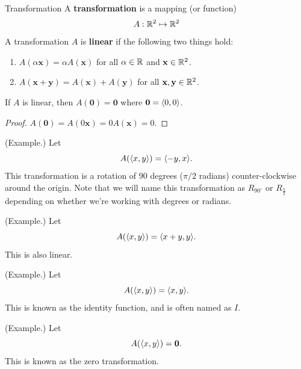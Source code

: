 \documentclass[letterpaper]{article}
\begin{document}
\begin{definition}{Transformation}{}
    A \textbf{transformation} is a mapping (or function) 
    \[A: \mathbb{R}^2 \mapsto \mathbb{R}^2\]
    A transformation $A$ is \textbf{linear} if the following two things hold: 
    \begin{enumerate}
        \item $A(\alpha \mathbf{x}) = \alpha A(\mathbf{x})$ for all $\alpha \in \mathbb{R}$ and $\mathbf{x} \in \mathbb{R}^2$. 
        \item $A(\mathbf{x} + \mathbf{y}) = A(\mathbf{x}) + A(\mathbf{y})$ for all $\mathbf{x}, \mathbf{y} \in \mathbb{R}^2$. 
    \end{enumerate}
\end{definition}

\begin{theorem}{}{}
    If $A$ is linear, then $A(\mathbf{0}) = \mathbf{0}$ where $\mathbf{0} = \langle 0, 0 \rangle$. 
\end{theorem}

\begin{mdframed}[]
    \begin{proof}
        $A(\mathbf{0}) = A(0 \mathbf{x}) = 0A(\mathbf{x}) = 0.$ 
    \end{proof}
\end{mdframed}

\begin{mdframed}[]
    (Example.) Let  
    \[A(\langle x, y \rangle) = \langle -y, x \rangle.\]
    This transformation is a rotation of 90 degrees ($\pi / 2$ radians) counter-clockwise around the origin. Note that we will name this transformation as $R_{90^{\circ}}$ or $R_{\frac{\pi}{2}}$ depending on whether we're working with degrees or radians. 
\end{mdframed}

\begin{mdframed}[]
    (Example.) Let 
    \[A(\langle x, y \rangle) = \langle x + y, y \rangle.\]
    This is also linear. 
\end{mdframed}

\begin{mdframed}[]
    (Example.) Let 
    \[A(\langle x, y \rangle) = \langle x, y \rangle.\]
    This is known as the identity function, and is often named as $I$. 
\end{mdframed}

\begin{mdframed}[]
    (Example.) Let 
    \[A(\langle x, y \rangle) = \mathbf{0}.\]
    This is known as the zero transformation. 
\end{mdframed}
\end{document}
